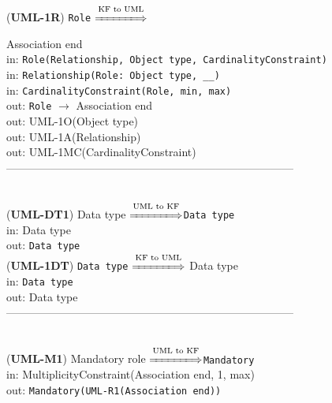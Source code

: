 \documentclass[sn-mathphys]{sn-jnl}
\begin{document}
({\bf UML-1R}) {\tt Role} $\overset{\text{KF to UML}}{\xLongrightarrow{\hspace*{1.4cm}}}${ Association end\\
\hspace*{0.3cm}in: {\tt Role(Relationship, Object type, CardinalityConstraint)}\\
\hspace*{0.3cm}in: {\tt Relationship(Role: Object type, \_\_)}\\
\hspace*{0.3cm}in: {\tt CardinalityConstraint(Role, min, max)}\\
\hspace*{0.5cm}out: {\tt Role} $\rightarrow$ {Association end}\\
\hspace*{0.5cm}out: {UML-1O(Object type)}\\
\hspace*{0.5cm}out: {UML-1A(Relationship)}\\
\hspace*{0.5cm}out: {UML-1MC(CardinalityConstraint)}\\
------------------------------------------------------------------------------
\\ \

({\bf UML-DT1}) Data type $\overset{\text{UML to KF}}{\xLongrightarrow{\hspace*{1.4cm}}}${\tt Data type}\\
\hspace*{0.3cm}in: Data type\\
\hspace*{0.5cm}out: {\tt Data type}\\

({\bf UML-1DT}) {\tt Data type} $\overset{\text{KF to UML}}{\xLongrightarrow{\hspace*{1.4cm}}}$ Data type\\
\hspace*{0.3cm}in: {\tt Data type}\\
\hspace*{0.5cm}out: Data type\\

------------------------------------------------------------------------------
\\ \

({\bf UML-M1}) Mandatory role $\overset{\text{UML to KF}}{\xLongrightarrow{\hspace*{1.4cm}}}${\tt Mandatory}\\
\hspace*{0.3cm}in: MultiplicityConstraint(Association end, 1, max)\\
\hspace*{0.5cm}out: {\tt Mandatory(UML-R1(Association end))}\\

}
\end{document}
